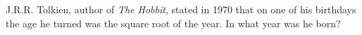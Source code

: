 J.R.R. Tolkien, author of \emph{The Hobbit}, stated in 1970 that on one of his birthdays the age he turned was the square root of the year. In what year was he born?
